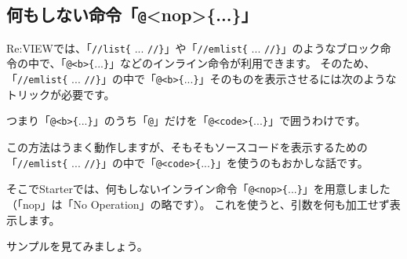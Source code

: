 \subsection*{何もしない命令「\texttt{@}\textless{}nop\textgreater{}\{...\}」}
\label{sec:1-1-17}

Re:VIEWでは、「\texttt{//list\{} ... \texttt{//\}}」や「\texttt{//emlist\{} ... \texttt{//\}}」のようなブロック命令の中で、「\texttt{@\textless{}b\textgreater{}\{}...\texttt{\}}」などのインライン命令が利用できます。
そのため、「\texttt{//emlist\{} ... \texttt{//\}}」の中で「\texttt{@\textless{}b\textgreater{}\{}...\texttt{\}}」そのものを表示させるには次のようなトリックが必要です。

\begin{starterprogram}\end{starterprogram}
\noindent
{}

\starterresult
\begin{starterprogram}\end{starterprogram}
\endstarterresult

つまり「\texttt{@\textless{}b\textgreater{}\{}...\texttt{\}}」のうち「\texttt{@}」だけを「\texttt{@\textless{}code\textgreater{}\{}...\texttt{\}}」で囲うわけです。

この方法はうまく動作しますが、そもそもソースコードを表示するための「\texttt{//emlist\{} ... \texttt{//\}}」の中で「\texttt{@\textless{}code\textgreater{}\{}...\texttt{\}}」を使うのもおかしな話です。

そこでStarterでは、何もしないインライン命令「\texttt{@\textless{}nop\textgreater{}\{}...\texttt{\}}」を用意しました（「nop」は「No Operation」の略です）。
これを使うと、引数を何も加工せず表示します。

サンプルを見てみましょう。

\begin{starterprogram}\end{starterprogram}
\noindent
{}

